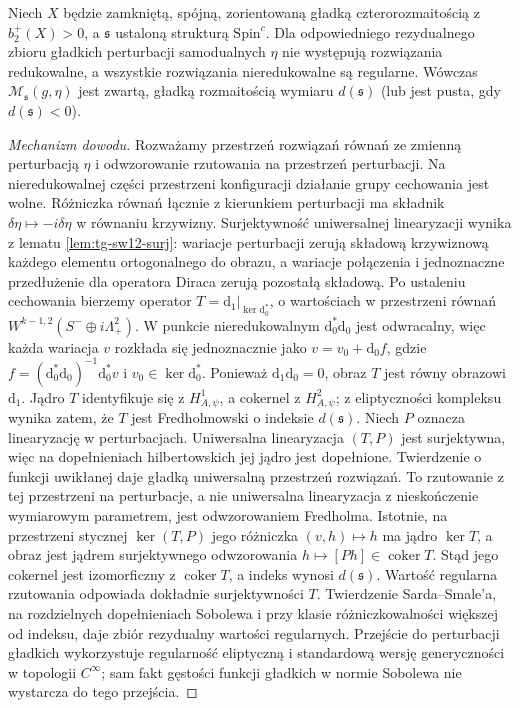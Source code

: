 \begin{twierdzenie}
\label{thm:tg-sw-generic}
Niech $X$ będzie zamkniętą, spójną, zorientowaną
gładką czterorozmaitością z $b_2^+(X)>0$,
a $\mathfrak s$ ustaloną strukturą $\mathrm{Spin}^c$.
Dla odpowiedniego rezydualnego zbioru gładkich perturbacji
samodualnych $\eta$ nie występują rozwiązania redukowalne,
a wszystkie rozwiązania nieredukowalne są regularne.
Wówczas $\mathcal M_{\mathfrak s}(g,\eta)$ jest zwartą,
gładką rozmaitością wymiaru $d(\mathfrak s)$
(lub jest pusta, gdy $d(\mathfrak s)<0$).
\end{twierdzenie}

\begin{proof}[Mechanizm dowodu]
Rozważamy przestrzeń rozwiązań równań ze zmienną
perturbacją $\eta$ i odwzorowanie rzutowania na przestrzeń
perturbacji. Na nieredukowalnej części przestrzeni konfiguracji
działanie grupy cechowania jest wolne. Różniczka równań
łącznie z kierunkiem perturbacji ma składnik
$\delta\eta\mapsto-i\delta\eta$ w równaniu krzywizny.
Surjektywność uniwersalnej linearyzacji wynika
z lematu \ref{lem:tg-sw12-surj}: wariacje perturbacji
zerują składową krzywiznową każdego elementu
ortogonalnego do obrazu, a wariacje połączenia
i jednoznaczne przedłużenie dla operatora Diraca
zerują pozostałą składową.
Po ustaleniu cechowania bierzemy operator
$T=\mathrm d_1|_{\ker\mathrm d_0^*}$, o wartościach
w przestrzeni równań $W^{k-1,2}(S^-\oplus i\Lambda^2_+)$.
W punkcie nieredukowalnym $\mathrm d_0^*\mathrm d_0$
jest odwracalny, więc każda wariacja $v$ rozkłada
się jednoznacznie jako
$v=v_0+\mathrm d_0 f$, gdzie
$f=(\mathrm d_0^*\mathrm d_0)^{-1}\mathrm d_0^*v$
i $v_0\in\ker\mathrm d_0^*$.
Ponieważ $\mathrm d_1\mathrm d_0=0$, obraz $T$
jest równy obrazowi $\mathrm d_1$.
Jądro $T$ identyfikuje się z $H^1_{A,\psi}$,
a cokernel z $H^2_{A,\psi}$; z eliptyczności
kompleksu wynika zatem, że $T$ jest Fredholmowski
o indeksie $d(\mathfrak s)$.
Niech $P$ oznacza linearyzację w perturbacjach.
Uniwersalna linearyzacja $(T,P)$ jest surjektywna,
więc na dopełnieniach hilbertowskich jej jądro
jest dopełnione. Twierdzenie o funkcji uwikłanej
daje gładką uniwersalną przestrzeń rozwiązań.
To rzutowanie z tej przestrzeni na perturbacje,
a nie uniwersalna linearyzacja z nieskończenie
wymiarowym parametrem, jest odwzorowaniem Fredholma.
Istotnie, na przestrzeni stycznej
$\ker(T,P)$ jego różniczka $(v,h)\mapsto h$
ma jądro $\ker T$, a obraz jest jądrem
surjektywnego odwzorowania
$h\mapsto [Ph]\in\operatorname{coker}T$.
Stąd jego cokernel jest izomorficzny z
$\operatorname{coker}T$, a indeks wynosi
$d(\mathfrak s)$. Wartość regularna rzutowania
odpowiada dokładnie surjektywności $T$.
Twierdzenie Sarda--Smale'a, na rozdzielnych
dopełnieniach Sobolewa i przy klasie różniczkowalności
większej od indeksu, daje zbiór rezydualny
wartości regularnych. Przejście do perturbacji
gładkich wykorzystuje regularność eliptyczną
i standardową wersję generyczności w topologii
$C^\infty$; sam fakt gęstości funkcji gładkich
w normie Sobolewa nie wystarcza do tego przejścia.


\end{proof}
